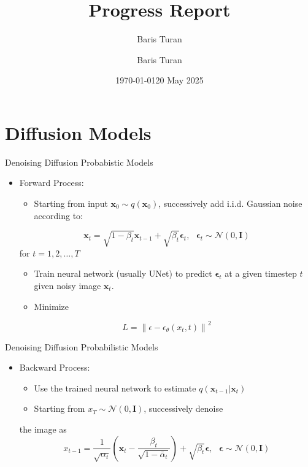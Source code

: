 \documentclass[./main.tex]{subfiles}
\author{Baris Turan}
\date{\today}
\title{}
\title[Progress Report]{Progress Report}
\author[ITLR-DDSim]{Baris Turan}
\date{20 May 2025}
\begin{document}
\maketitle

\section{Diffusion Models}
\label{sec:org530609e}
\begin{frame}[label={sec:org52a6a9a}]{Denoising Diffusion Probabistic Models}
\begin{itemize}
\item Forward Process:
\begin{itemize}
\item Starting from input \(\mathbf{x}_0\sim q(\mathbf{x}_0)\), successively add i.i.d. Gaussian noise according to:
\end{itemize}
\begin{equation*}
\mathbf{x}_t = \sqrt{1-\beta_t}\mathbf{x}_{t-1}+\sqrt{\beta_t}\mathbf{\epsilon}_t, \text{ }
\mathbf{\epsilon}_t\sim\mathcal{N}(0, \mathbf{I})
\end{equation*}
for \(t=1,2, \ldots,T\)
\begin{itemize}
\item Train neural network (usually UNet) to predict \(\mathbf{\epsilon}_t\) at a given timestep \(t\) given noisy image \(\mathbf{x}_t\).
\item Minimize
\end{itemize}
\begin{equation*}
      L=\left \lVert \epsilon - \epsilon_\theta(x_t, t)\right \rVert^2
\end{equation*}
\end{itemize}
\end{frame}
\begin{frame}[label={sec:orgbe203e9}]{Denoising Diffusion Probabilistic Models}
\begin{itemize}
\item Backward Process:
\begin{itemize}
\item Use the trained neural network to estimate \(q(\mathbf{x}_{t-1}|\mathbf{x}_t)\)
\item Starting from \(x_{T}\sim\mathcal{N}(0, \mathbf{I})\), successively denoise
\end{itemize}
the image as
\begin{equation*}
      x_{t-1}=\frac{1}{\sqrt{\alpha_t}}\left(\mathbf{x}_t-\frac{\beta_t}{\sqrt{1-\bar{\alpha}_t}}\right)+\sqrt{\beta_t}\mathbf{\epsilon}, 
      \text{ } \mathbf{\epsilon}\sim\mathcal{N}(0, \mathbf{I})
\end{equation*}
\end{itemize}
\end{frame}
\end{document}
